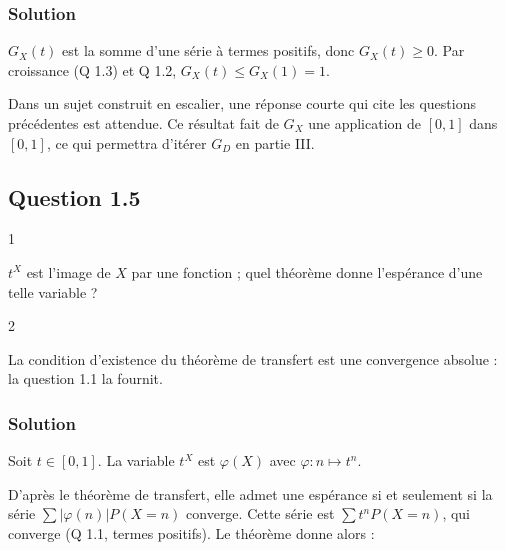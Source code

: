 \documentclass[11pt,a4paper]{article}
\newcommand{\equationajustee}[1]{%
  \sbox{\boiteequation}{$\displaystyle #1$}%
  \ifdim\wd\boiteequation>\linewidth
    \[\resizebox{\linewidth}{!}{\usebox{\boiteequation}}\]%
  \else
    \[#1\]%
  \fi}
\begin{document}
\hypertarget{solution-3}{%
\subsubsection{Solution}\label{solution-3}}

\(G_X(t)\) est la somme d'une série à termes positifs, donc \(G_X(t)\ge0\). Par croissance (Q 1.3) et Q 1.2, \(G_X(t)\le G_X(1)=1\).

\equationajustee{\boxed{\forall t\in[0,1],\ G_X(t)\in[0,1]}}

\begin{methode}

Dans un sujet construit en escalier, une réponse courte qui cite les questions précédentes est attendue. Ce résultat fait de \(G_X\) une application de \([0,1]\) dans \([0,1]\), ce qui permettra d'itérer \(G_D\) en partie III.

\end{methode}

\hypertarget{question-1.5}{%
\subsection{Question 1.5}\label{question-1.5}}

\begin{indication}{1}

\(t^X\) est l'image de \(X\) par une fonction ; quel théorème donne l'espérance d'une telle variable ?

\end{indication}

\begin{indication}{2}

La condition d'existence du théorème de transfert est une convergence absolue : la question 1.1 la fournit.

\end{indication}

\hypertarget{solution-4}{%
\subsubsection{Solution}\label{solution-4}}

Soit \(t\in[0,1]\). La variable \(t^X\) est \(\varphi(X)\) avec \(\varphi:n\mapsto t^n\).

D'après le théorème de transfert, elle admet une espérance si et seulement si la série \(\sum|\varphi(n)|P(X=n)\) converge. Cette série est \(\sum t^nP(X=n)\), qui converge (Q 1.1, termes positifs). Le théorème donne alors :
\end{document}
